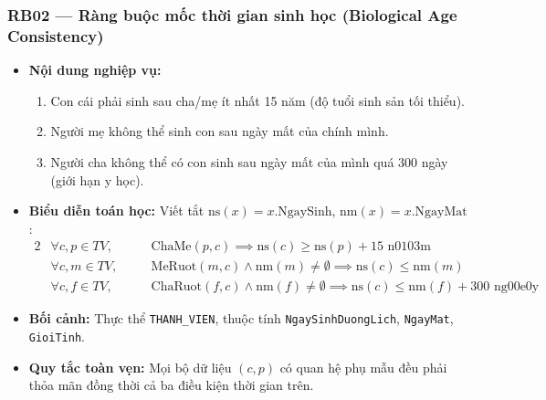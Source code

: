 \subsubsection{RB02 --- Ràng buộc mốc thời gian sinh học (Biological Age Consistency)}
\begin{itemize}
    \item \textbf{Nội dung nghiệp vụ:}
    \begin{enumerate}[label=(\alph*),noitemsep]
        \item Con cái phải sinh sau cha/mẹ ít nhất 15 năm (độ tuổi sinh sản tối thiểu).
        \item Người mẹ không thể sinh con sau ngày mất của chính mình.
        \item Người cha không thể có con sinh sau ngày mất của mình quá 300 ngày (giới hạn y học).
    \end{enumerate}
    \item \textbf{Biểu diễn toán học:} Viết tắt $\text{ns}(x) = x.\text{NgaySinh}$, $\text{nm}(x) = x.\text{NgayMat}$:
    \begin{alignat}{2}
        &\forall c, p \in TV, \quad
        &&\text{ChaMe}(p, c) \implies \text{ns}(c) \ge \text{ns}(p) + 15\text{ n\u0103m} \\[3pt]
        &\forall c, m \in TV, \quad
        &&\text{MeRuot}(m, c) \land \text{nm}(m) \ne \emptyset \implies \text{ns}(c) \le \text{nm}(m) \\[3pt]
        &\forall c, f \in TV, \quad
        &&\text{ChaRuot}(f, c) \land \text{nm}(f) \ne \emptyset \implies \text{ns}(c) \le \text{nm}(f) + 300\text{ ng\u00e0y}
    \end{alignat}
    \item \textbf{Bối cảnh:} Thực thể \texttt{THANH\_VIEN}, thuộc tính \texttt{NgaySinh\-DuongLich}, \texttt{NgayMat}, \texttt{GioiTinh}.
    \item \textbf{Quy tắc toàn vẹn:} Mọi bộ dữ liệu $(c, p)$ có quan hệ phụ mẫu đều phải thỏa mãn đồng thời cả ba điều kiện thời gian trên.
\end{itemize}


